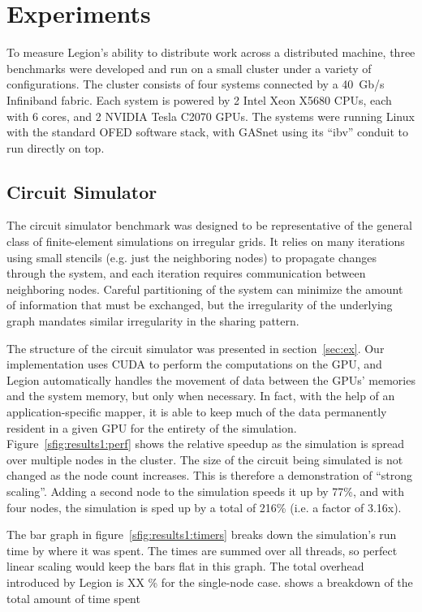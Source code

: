 \section{Experiments}
\label{sec:exp}

To measure Legion's ability to distribute work across a distributed machine, 
three benchmarks were developed and run on a small cluster under a variety
of configurations.  The cluster consists of four systems connected by a 40~Gb/s
Infiniband fabric.  Each system is powered by 2 Intel Xeon X5680 CPUs, each
with 6 cores, and 2 NVIDIA Tesla C2070 GPUs.  The systems were running Linux
with the standard OFED software stack, with GASnet using its ``ibv'' conduit
to run directly on top.


\subsection{Circuit Simulator}

The circuit simulator benchmark was designed to be representative of the
general class of finite-element simulations on irregular grids.  It relies
on many iterations using small stencils (e.g. just the neighboring nodes) to
propagate changes through the system, and each iteration requires communication
between neighboring nodes.  Careful partitioning of the system can minimize
the amount of information that must be exchanged, but the irregularity of the
underlying graph mandates similar irregularity in the sharing pattern.

The structure of the circuit simulator was presented in section~\ref{sec:ex}.
Our implementation uses CUDA to perform the computations on the GPU, and Legion
automatically handles the movement of data between the GPUs' memories and the
system memory, but only when necessary.  In fact, with the help of an
application-specific mapper, it is able to keep much of
the data permanently resident in a given GPU for the entirety of the simulation.
Figure~\ref{sfig:results1:perf} shows the relative speedup as the simulation is
spread over multiple nodes in the cluster.  The size of the circuit
being simulated is not changed as the node count increases.  This is therefore
a demonstration of ``strong scaling''.  Adding a second node to the simulation
speeds it up by 77\%, and with four nodes, the simulation is sped up by a total
of 216\% (i.e. a factor of 3.16x).

The bar graph in figure~\ref{sfig:results1:timers} breaks down the simulation's
run time by where it was spent.  The times are summed over all threads, so 
perfect linear scaling would keep the bars flat in this graph.  The total
overhead introduced by Legion is XX \% for the single-node case.
shows a breakdown of the
total amount of time spent 

